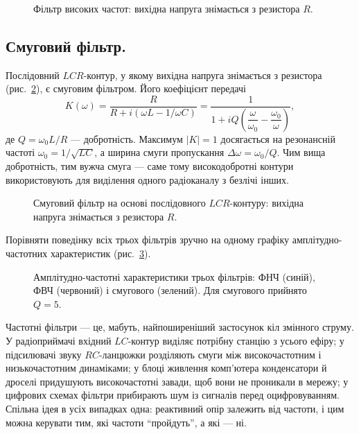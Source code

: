 \begin{figure}
	\centering
	\caption{Фільтр високих частот: вихідна напруга знімається з резистора $R$.}
	\label{tikz:highpass}
\end{figure}

\subsection*{Смуговий фільтр.}
Послідовний $LCR$-контур, у якому вихідна напруга знімається з резистора (рис.~\ref{tikz:bandpass}), є смуговим фільтром. Його коефіцієнт передачі
\begin{equation}\label{eq:bandpass_transfer}
	K(\omega) = \frac{R}{R + i(\omega L - 1/\omega C)}
	          = \frac{1}{1 + iQ\left(\dfrac{\omega}{\omega_0} - \dfrac{\omega_0}{\omega}\right)},
\end{equation}
де $Q = \omega_0 L/R$ --- добротність. Максимум $|K| = 1$ досягається на резонансній частоті $\omega_0 = 1/\sqrt{LC}$, а ширина смуги пропускання $\Delta\omega = \omega_0/Q$. Чим вища добротність, тим вужча смуга --- саме тому високодобротні контури використовують для виділення одного радіоканалу з безлічі інших.

\begin{figure}[h!]
	\centering
	\caption{Смуговий фільтр на основі послідовного $LCR$-контуру: вихідна напруга знімається з резистора $R$.}
	\label{tikz:bandpass}
\end{figure}

Порівняти поведінку всіх трьох фільтрів зручно на одному графіку амплітудно-частотних характеристик (рис.~\ref{tikz:filter_responses}).

\begin{figure}[h!]
	\centering
	\caption{Амплітудно-частотні характеристики трьох фільтрів: ФНЧ (синій), ФВЧ (червоний) і смугового (зелений). Для смугового прийнято $Q = 5$.}
	\label{tikz:filter_responses}
\end{figure}

\begin{Attention}
	Частотні фільтри --- це, мабуть, найпоширеніший застосунок кіл змінного струму. У радіоприймачі вхідний $LC$-контур виділяє потрібну станцію з усього ефіру; у підсилювачі звуку $RC$-ланцюжки розділяють смуги між високочастотним і низькочастотним динаміками; у блоці живлення комп'ютера конденсатори й дроселі придушують високочастотні завади, щоб вони не проникали в мережу; у цифрових схемах фільтри прибирають шум із сигналів перед оцифровуванням. Спільна ідея в усіх випадках одна: реактивний опір залежить від частоти, і цим можна керувати тим, які частоти \enquote{пройдуть}, а які --- ні.
\end{Attention}

